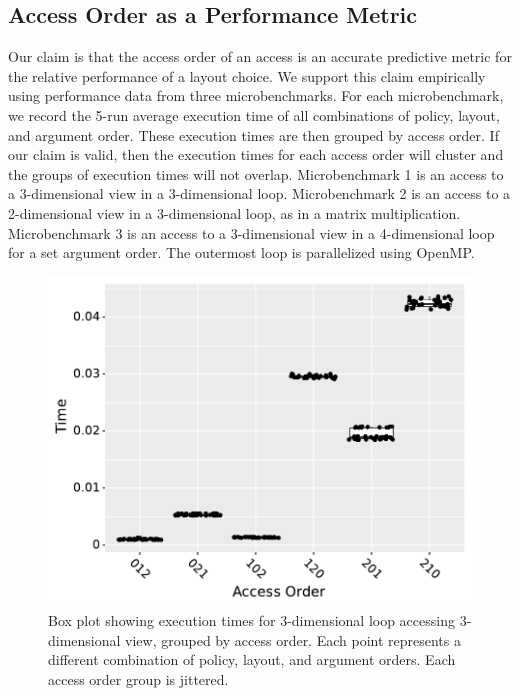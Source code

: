 \documentclass[sigconf]{acmart}
\begin{document}
\subsection{Access Order as a Performance Metric}
\label{sec:AccessMetric}
Our claim is that the access order of an access is an accurate predictive metric for the relative performance of a layout choice. 
We support this claim empirically using performance data from three microbenchmarks.
For each microbenchmark, we record the 5-run average execution time of all combinations of policy, layout, and argument order. 
These execution times are then grouped by access order.
If our claim is valid, then the execution times for each access order will cluster and the groups of execution times will not overlap.
Microbenchmark 1 is an access to a 3-dimensional view in a 3-dimensional loop. 
Microbenchmark 2 is an access to a 2-dimensional view in a 3-dimensional loop, as in a matrix multiplication.
Microbenchmark 3 is an access to a 3-dimensional view in a 4-dimensional loop for a set argument order.
The outermost loop is parallelized using OpenMP.

\begin{figure}
	\includegraphics[width=\columnwidth]{benchmark1_boxplot.pdf}
	\caption{Box plot showing execution times for 3-dimensional loop accessing 3-dimensional view, grouped by access order. Each point represents a different combination of policy, layout, and argument orders. Each access order group is jittered.}
	\label{AccessBenchmark1}
\end{figure}
\end{document}
